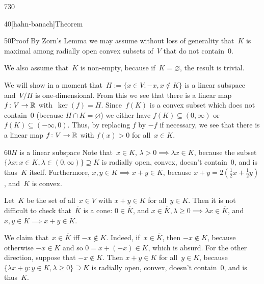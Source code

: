 \begin{parsec}{730}
\begin{point}{40}[hahn-banach]{Theorem}
\begin{point}{50}{Proof}
By Zorn's Lemma we may assume without loss of generality that~$K$ is maximal
among radially open convex subsets of~$V$ that do not contain~$0$.

We also assume that~$K$ is non-empty,
because if~$K=\varnothing$, the result is trivial.

We will show in a moment that~$H:=\{x\in V\colon -x,x\notin K\}$
is a linear subspace and~$V/H$ is one-dimensional.
From this we see that there is a linear map $f\colon V\to\mathbb{R}$
with~$\ker(f)=H$.
Since~$f(K)$ is a convex subset which does not contain~$0$
(because $H\cap K=\varnothing$)
we either have $f(K)\subseteq (0,\infty)$
or $f(K)\subseteq(-\infty,0)$.
Thus, by replacing $f$ by $-f$ if necessary,
we see that there is a linear map $f\colon V\to \mathbb{R}$
with $f(x)>0$ for all~$x\in K$.
\begin{point}{60}{$H$ is a linear subspace}%
Note that~$x\in K,\,\lambda>0\implies \lambda x\in K$,
because the subset 
$\{\lambda x\colon x\in K,\lambda\in(0,\infty)\}\supseteq K$
is radially open, convex, doesn't contain~$0$,
and is thus~$K$ itself.
Furthermore,
$x,y\in K\implies x+y\in K$, because
$x+y=2(\frac{1}{2}x + \frac{1}{2}y)$, and~$K$ is convex.

Let~$\overline{K}$ be the set of all~$x\in V$
with $x+y\in K$ for all~$y\in K$.
Then it is not difficult to check that~$\overline{K}$ is a cone:
 $0\in\overline{K}$,
and
$x\in \overline{K},\lambda\geq 0\implies \lambda x\in \overline{K}$, and
$x,y\in\overline{K}\implies x+y\in \overline{K}$.

We claim that~$x\in \overline{K}$ iff $-x\notin K$.
Indeed, if~$x\in\overline{K}$, then $-x\notin K$, because otherwise
$-x\in K$ and so
$0=x+(-x)\in K$, which is absurd.
For the other direction, suppose that $-x\notin K$.
Then $x+y\in K$ for all~$y\in K$,
because
$\{\lambda x+y\colon y\in K,\lambda\geq0\}\supseteq K$
is radially open, convex, doesn't contain~$0$,
and is thus~$K$.


\end{point}
\end{point}
\end{point}
\end{parsec}
